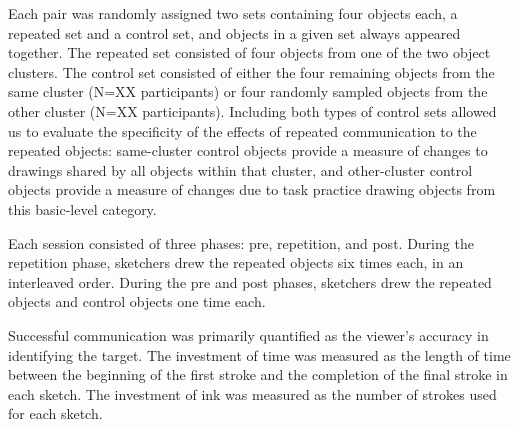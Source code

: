 \documentclass[10pt,letterpaper]{article}
\begin{document}
Each pair was randomly assigned two sets containing four objects each, a repeated set and a control set, and objects in a given set always appeared together. 
The repeated set consisted of four objects from one of the two object clusters. 
The control set consisted of either the four remaining objects from the same cluster (N=XX participants) or four randomly sampled objects from the other cluster (N=XX participants).
Including both types of control sets allowed us to evaluate the specificity of the effects of repeated communication to the repeated objects: same-cluster control objects provide a measure of changes to drawings shared by all objects within that cluster, and other-cluster control objects provide a measure of changes due to task practice drawing objects from this basic-level category.

Each session consisted of three phases: pre, repetition, and post. During the repetition phase, sketchers drew the repeated objects six times each, in an interleaved order. During the pre and post phases, sketchers drew the repeated objects and control objects one time each.

Successful communication was primarily quantified as the viewer's accuracy in identifying the target. The investment of time was measured as the length of time between the beginning of the first stroke and the completion of the final stroke in each sketch. The investment of ink was measured as the number of strokes used for each sketch. 



\end{document}
